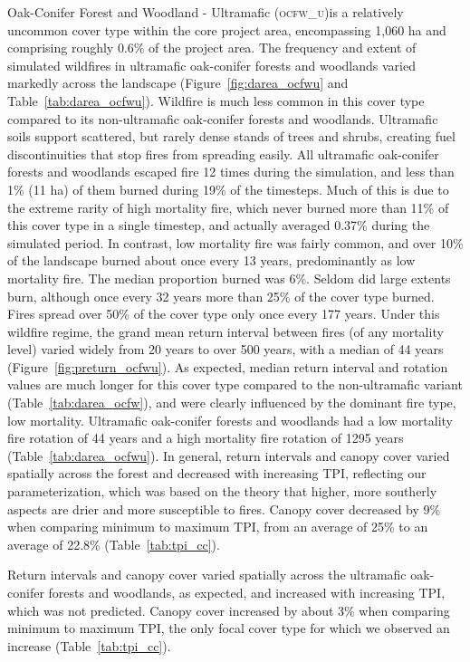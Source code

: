Oak-Conifer Forest and Woodland - Ultramafic (\textsc{ocfw\_u})is a relatively uncommon cover type within the core project area, encompassing 1,060 ha and comprising roughly 0.6\% of the project area. The frequency and extent of simulated wildfires in ultramafic oak-conifer forests and woodlands varied markedly across the landscape (Figure~\ref{fig:darea_ocfwu} and Table~\ref{tab:darea_ocfwu}). %
%
Wildfire is much less common in this cover type compared to its non-ultramafic oak-conifer forests and woodlands. Ultramafic soils support scattered, but rarely dense stands of trees and shrubs, creating fuel discontinuities that stop fires from spreading easily. All ultramafic oak-conifer forests and woodlands escaped fire 12 times during the simulation, and less than 1\% (11 ha) of them burned during 19\% of the timesteps. Much of this is due to the extreme rarity of high mortality fire, which never burned more than 11\% of this cover type in a single timestep, and actually averaged 0.37\% during the simulated period. In contrast, low mortality fire was fairly common, and over 10\% of the landscape burned about once every 13 years, predominantly as low mortality fire. The median proportion burned was 6\%. Seldom did large extents burn, although once every 32 years more than 25\% of the cover type burned. Fires spread over 50\% of the cover type only once every 177 years.  %
%
Under this wildfire regime, the grand mean return interval between fires (of any mortality level) varied widely from 20 years to over 500 years, with a median of 44 years (Figure~\ref{fig:preturn_ocfwu}). As expected, median return interval and rotation values are much longer for this cover type compared to the non-ultramafic variant (Table~\ref{tab:darea_ocfw}), and were clearly influenced by the dominant fire type, low mortality. Ultramafic oak-conifer forests and woodlands had a low mortality fire rotation of 44 years and a high mortality fire rotation of 1295 years (Table~\ref{tab:darea_ocfwu}).  %
%
In general, return intervals and canopy cover varied spatially across the forest and decreased with increasing TPI, reflecting our parameterization, which was based on the theory that higher, more southerly aspects are drier and more susceptible to fires. Canopy cover decreased by 9\% when comparing minimum to maximum TPI, from an average of 25\% to an average of 22.8\% (Table~\ref{tab:tpi_cc}). %

Return intervals and canopy cover varied spatially across the ultramafic oak-conifer forests and woodlands, as expected, and increased with increasing TPI, which was not predicted. Canopy cover increased by about 3\% when comparing minimum to maximum TPI, the only focal cover type for which we observed an increase (Table~\ref{tab:tpi_cc}). 


